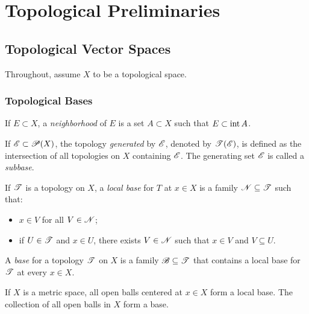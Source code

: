 \chapter{Topological Preliminaries}

\section{Topological Vector Spaces}

\noindent Throughout, assume $X$ to be a topological space.

\subsection{Topological Bases}

\begin{definition}
	If $E \subset X$, a \emph{neighborhood} of $E$ is a set $A \subset X$ such that $E \subset \operatorname{int} A$.
\end{definition}

\begin{definition}
	If $\mathscr{E} \subset \mathscr{P}(X)$, the topology \emph{generated} by $\mathscr{E}$, denoted by $\mathscr{T}(\mathscr{E})$, is defined as the intersection of all topologies on $X$ containing $\mathscr{E}$. The generating set $\mathscr{E}$ is called a \emph{subbase}.
\end{definition}

\begin{definition}
	If $\mathscr{T}$ is a topology on $X$, a \emph{local base} for $T$ at $x \in X$ is a family $\mathscr{N} \subseteq \mathscr{T}$ such that:
	\mbox{}
	\begin{itemize}[itemsep=1pt,topsep=3pt]
		\item $x \in V$ for all $V \in \mathscr{N}$;
		\item if $U \in \mathscr{T}$ and $x \in U$, there exists $V \in \mathscr{N}$ such that $x \in V$ and $V \subseteq U$.
	\end{itemize}
\end{definition}

\begin{definition}
	A \emph{base} for a topology $\mathscr{T}$ on $X$ is a family $\mathscr{B} \subseteq \mathscr{T}$ that contains a local base for $\mathscr{T}$ at every $x \in X$.
\end{definition}

\begin{example}
	If $X$ is a metric space, all open balls centered at $x \in X$ form a local base. The collection of all open balls in $X$ form a  base.
\end{example}

